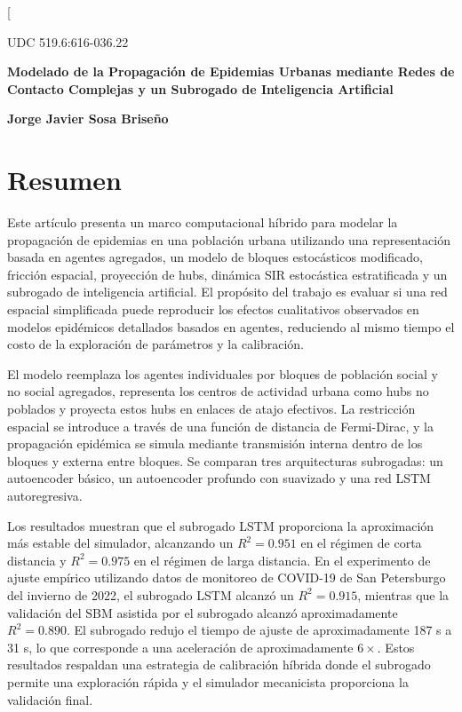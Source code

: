 \documentclass[12pt,a4paper,twocolumn]{article}
\begin{document}

\twocolumn[
\begin{@twocolumnfalse}

\noindent UDC 519.6:616-036.22

\vspace{0.5em}

\begin{center}
{\bfseries\Large Modelado de la Propagación de Epidemias Urbanas mediante Redes de Contacto Complejas y un Subrogado de Inteligencia Artificial}

\vspace{0.8em}

{\bfseries Jorge Javier Sosa Briseño}
\end{center}

\vspace{0.5em}

\section*{Resumen}

Este artículo presenta un marco computacional híbrido para modelar la propagación de epidemias en una población urbana utilizando una representación basada en agentes agregados, un modelo de bloques estocásticos modificado, fricción espacial, proyección de hubs, dinámica SIR estocástica estratificada y un subrogado de inteligencia artificial. El propósito del trabajo es evaluar si una red espacial simplificada puede reproducir los efectos cualitativos observados en modelos epidémicos detallados basados en agentes, reduciendo al mismo tiempo el costo de la exploración de parámetros y la calibración.

El modelo reemplaza los agentes individuales por bloques de población social y no social agregados, representa los centros de actividad urbana como hubs no poblados y proyecta estos hubs en enlaces de atajo efectivos. La restricción espacial se introduce a través de una función de distancia de Fermi-Dirac, y la propagación epidémica se simula mediante transmisión interna dentro de los bloques y externa entre bloques. Se comparan tres arquitecturas subrogadas: un autoencoder básico, un autoencoder profundo con suavizado y una red LSTM autoregresiva.

Los resultados muestran que el subrogado LSTM proporciona la aproximación más estable del simulador, alcanzando un $R^2=0.951$ en el régimen de corta distancia y $R^2=0.975$ en el régimen de larga distancia. En el experimento de ajuste empírico utilizando datos de monitoreo de COVID-19 de San Petersburgo del invierno de 2022, el subrogado LSTM alcanzó un $R^2=0.915$, mientras que la validación del SBM asistida por el subrogado alcanzó aproximadamente $R^2=0.890$. El subrogado redujo el tiempo de ajuste de aproximadamente 187 s a 31 s, lo que corresponde a una aceleración de aproximadamente $6\times$. Estos resultados respaldan una estrategia de calibración híbrida donde el subrogado permite una exploración rápida y el simulador mecanicista proporciona la validación final.



\end{@twocolumnfalse}
\end{document}
